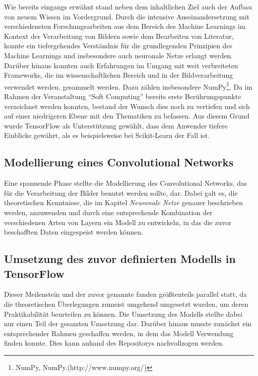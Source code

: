 Wie bereits eingangs erwähnt stand neben dem inhaltlichen Ziel auch der Aufbau von neuem Wissen im Vordergrund. Durch die
intensive Auseinandersetzung mit verschiedensten Forschungsarbeiten aus dem Bereich des Machine Learnings im Kontext der
Verarbeitung von Bildern sowie dem Bearbeiten von Literatur, konnte ein tiefergehendes Verständnis für die grundlegenden
Prinzipien des Machine Learnings und insbesondere auch neuronale Netze erlangt werden.
Darüber hinaus konnten auch Erfahrungen im Umgang mit weit verbreiteten Frameworks, die im wissenschaftlichen Bereich und
in der Bildverarbeitung verwendet werden, gesammelt werden. Dazu zählen insbesondere NumPy\footnote{NumPy, NumPy.\newline(http://www.numpy.org/)}.
Da im Rahmen der Veranstaltung ``Soft Computing'' bereits erste Berührungspunkte verzeichnet werden konnten, bestand der
Wunsch dies noch zu vertiefen und sich auf einer niedrigeren Ebene mit den Thematiken zu befassen. Aus diesem Grund wurde
TensorFlow als Unterstützung gewählt, dass dem Anwender tiefere Einblicke gewährt, als es beispielsweise bei Scikit-Learn
der Fall ist.

\subsection{Modellierung eines Convolutional Networks}

Eine spannende Phase stellte die Modellierung des Convolutional Networks, das für die Verarbeitung der Bilder benutzt
werden sollte, dar. Dabei galt es, die theoretischen Kenntnisse, die im Kapitel \textit{Neuronale Netze} genauer
beschrieben werden, anzuwenden und durch eine entsprechende Kombination der verschiedenen Arten von Layern ein Modell
zu entwickeln, in das die zuvor beschafften Daten eingespeist werden können.

\subsection{Umsetzung des zuvor definierten Modells in TensorFlow}

Dieser Meilenstein und der zuvor genannte fanden größtenteils parallel statt, da die theoretischen Überlegungen zumeist
umgehend umgesetzt wurden, um deren Praktikabilität beurteilen zu können. Die Umsetzung des Modells stellte dabei nur
einen Teil der gesamten Umsetzung dar. Darüber hinaus musste zunächst ein entsprechender Rahmen geschaffen werden, in
dem das Modell Verwendung finden konnte. Dies kann anhand des Repositorys nachvollzogen werden.

